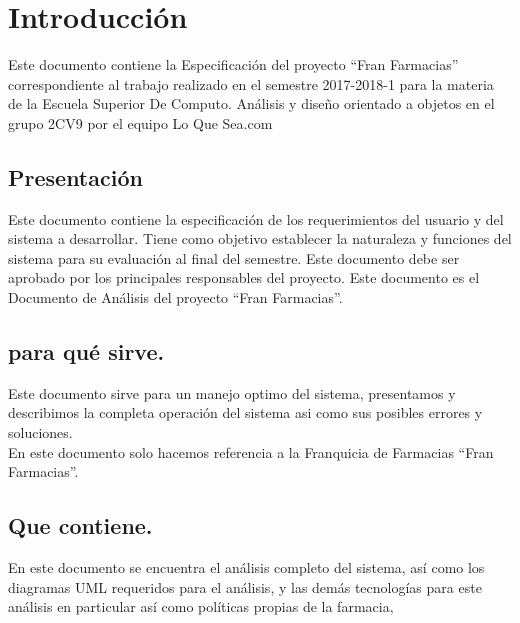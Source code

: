 \chapter{Introducción}
Este documento contiene la Especificación del proyecto “Fran Farmacias” correspondiente al trabajo realizado en el
semestre 2017-2018-1 para la materia de la Escuela Superior De Computo. Análisis y diseño orientado a objetos en el
grupo 2CV9 por el equipo Lo Que Sea.com

\section{Presentación}

Este documento contiene la especificación de los requerimientos del usuario y del sistema a desarrollar.
Tiene como objetivo establecer la naturaleza y funciones del sistema para su evaluación al final del semestre. 
Este documento debe ser aprobado por los principales responsables del proyecto.
Este documento es el Documento de Análisis del proyecto “Fran Farmacias”.

\section{para qué sirve.}
Este documento sirve para un manejo optimo del sistema, presentamos y describimos la completa operación del sistema asi como sus posibles errores y soluciones.\\
En este documento solo hacemos referencia a la Franquicia de Farmacias “Fran Farmacias”.
\section{Que contiene.}
En este documento se encuentra el análisis completo del sistema, así como los diagramas UML requeridos para el análisis, y las demás tecnologías para este análisis en particular así como políticas propias de la farmacia,
